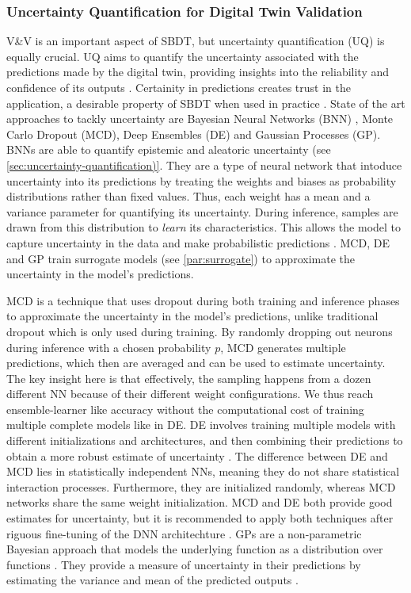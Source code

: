 \subsubsection*{Uncertainty Quantification for Digital Twin Validation}
\label{sec:uq-dt}
V&V is an important aspect of SBDT, but uncertainty quantification (UQ) is equally crucial. UQ aims to quantify the uncertainty associated with the predictions made by the digital twin, providing insights into the reliability and confidence of its outputs \autocite{sel2025survey}. Certainity in predictions creates trust in the application, a desirable property of SBDT when used in practice \autocite{dwivedi2023explainable}. State of the art approaches to tackly uncertainty are Bayesian Neural Networks (BNN) \autocite{li2017dynamic}, Monte Carlo Dropout (MCD), Deep Ensembles (DE) and Gaussian Processes (GP). BNNs are able to quantify epistemic and aleatoric uncertainty (see \autoref{sec:uncertainty-quantification)}. They are a type of neural network that intoduce uncertainty into its predictions by treating the weights and biases as probability distributions rather than fixed values. Thus, each weight has a mean and a variance parameter for quantifying its uncertainty. During inference, samples are drawn from this distribution to \textit{learn} its characteristics. This allows the model to capture uncertainty in the data and make probabilistic predictions \autocite{li2017dynamic}. MCD, DE and GP train surrogate models (see \autoref{par:surrogate}) to approximate the uncertainty in the model's predictions.

MCD is a technique that uses dropout \autocite{srivastava2014dropout} during both training and inference phases to approximate the uncertainty in the model's predictions, unlike traditional dropout which is only used during training. By randomly dropping out neurons during inference with a chosen probability $p$, MCD generates multiple predictions, which then are averaged and can be used to estimate uncertainty. The key insight here is that effectively, the sampling happens from a dozen different NN because of their different weight configurations. We thus reach ensemble-learner like accuracy without the computational cost of training multiple complete models like in DE.
DE involves training multiple models with different initializations and architectures, and then combining their predictions to obtain a more robust estimate of uncertainty \autocite{rahaman2021uncertainty}. The difference between DE and MCD lies in statistically independent NNs, meaning they do not share statistical interaction processes. Furthermore, they are initialized randomly, whereas MCD networks share the same weight initialization. MCD and DE both provide good estimates for uncertainty, but it is recommended to apply both techniques after riguous fine-tuning of the DNN architechture \autocite{kamali2024advancements}.
GPs are a non-parametric Bayesian approach that models the underlying function as a distribution over functions \autocite{bilionis2012multi}. They provide a measure of uncertainty in their predictions by estimating the variance and mean of the predicted outputs \autocite{Burr2025TEADT}.

